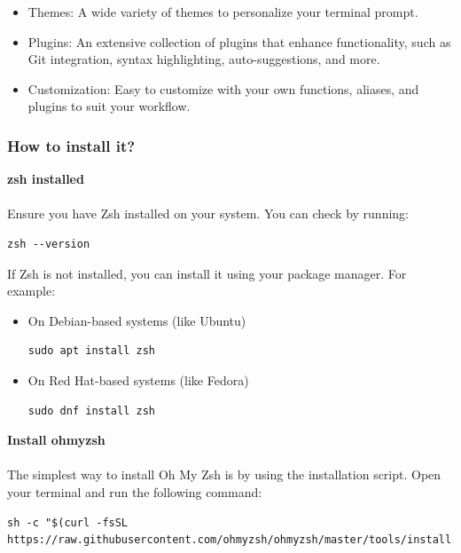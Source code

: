 \documentclass{article}
\newenvironment{codetemplate}[1][]{%
  \mybasecolorbox[#1]
  \itshape
}{%
  \endmybasecolorbox
}
\begin{document}
\begin{itemize}
    \item Themes: A wide variety of themes to personalize your terminal prompt.
    \item Plugins: An extensive collection of plugins that enhance functionality, such as Git integration, syntax highlighting, auto-suggestions, and more.
    \item Customization: Easy to customize with your own functions, aliases, and plugins to suit your workflow.
\end{itemize}

\subsubsection{How to install it?}

\textbf{zsh installed}
\\\\
Ensure you have Zsh installed on your system. You can check by running:
\begin{codetemplate}
\begin{verbatim}
zsh --version
\end{verbatim}
\end{codetemplate}

If Zsh is not installed, you can install it using your package manager. For example:
\begin{itemize}
    \item On Debian-based systems (like Ubuntu)
\begin{codetemplate}
\begin{verbatim}
sudo apt install zsh
\end{verbatim}
\end{codetemplate}
    \item On Red Hat-based systems (like Fedora)
\begin{codetemplate}
\begin{verbatim}
sudo dnf install zsh
\end{verbatim}
\end{codetemplate}
\end{itemize}

\textbf{Install ohmyzsh}
\\\\
The simplest way to install Oh My Zsh is by using the installation script. Open your terminal and run the following command:
\begin{codetemplate}
\begin{verbatim}
sh -c "$(curl -fsSL https://raw.githubusercontent.com/ohmyzsh/ohmyzsh/master/tools/install.sh)"
\end{verbatim}
\end{codetemplate}
\end{document}
